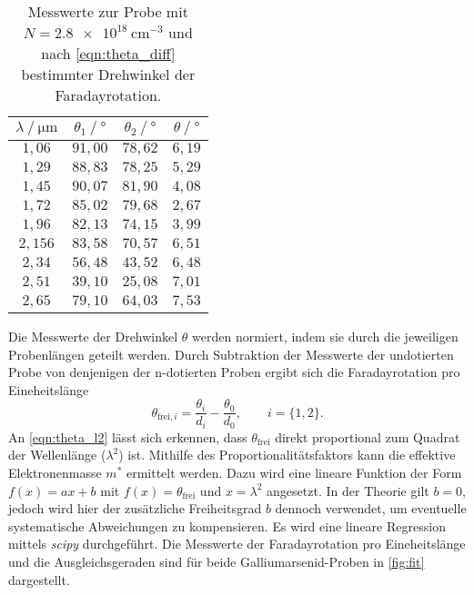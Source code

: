 \begin{table}
  \centering
  \caption{Messwerte zur Probe mit $N = \qty{2.8e18}{\centi\metre^{-3}}$ und nach \autoref{eqn:theta_diff} bestimmter Drehwinkel der Faradayrotation.}
  \label{tab:mw3}
  \begin{tabular}{c c c c}
    \toprule
    $\lambda \mathbin{/} \unit{\micro\meter}$ & $\theta_{1} \mathbin{/} \unit{\degree}$ & $\theta_{2} \mathbin{/} \unit{\degree}$ &%
     $\theta \mathbin{/} \unit{\degree}$ \\
    \midrule
    $1,06 $ & $91,00$ & $78,62$ & $6,19$ \\
    $1,29 $ & $88,83$ & $78,25$ & $5,29$ \\
    $1,45 $ & $90,07$ & $81,90$ & $4,08$ \\
    $1,72 $ & $85,02$ & $79,68$ & $2,67$ \\
    $1,96 $ & $82,13$ & $74,15$ & $3,99$ \\
    $2,156$ & $83,58$ & $70,57$ & $6,51$ \\
    $2,34 $ & $56,48$ & $43,52$ & $6,48$ \\
    $2,51 $ & $39,10$ & $25,08$ & $7,01$ \\
    $2,65 $ & $79,10$ & $64,03$ & $7,53$ \\
    \bottomrule
  \end{tabular}
\end{table}

Die Messwerte der Drehwinkel $\theta$ werden normiert, indem sie durch die jeweiligen Probenlängen geteilt werden. Durch Subtraktion der Messwerte der undotierten Probe von 
denjenigen der n-dotierten Proben ergibt sich die Faradayrotation pro Eineheitslänge 
\begin{equation*}
  \theta_{\text{frei}, i} = \frac{\theta_i}{d_i} - \frac{\theta_0}{d_0}, \qquad i = \{1, 2\}.
\end{equation*}
An \autoref{eqn:theta_l2} lässt sich erkennen, dass $\theta_\text{frei}$ direkt proportional zum Quadrat der Wellenlänge ($\lambda^2$) ist. Mithilfe des Proportionalitätsfaktors 
kann die effektive Elektronenmasse $m^*$ ermittelt werden. Dazu wird eine lineare Funktion der Form $f(x) = ax + b$ mit $f(x) = \theta_\text{frei}$ und $x = \lambda^2$
angesetzt. In der Theorie gilt $b = 0$, jedoch wird hier der zusätzliche Freiheitsgrad $b$ dennoch verwendet, um eventuelle systematische Abweichungen zu kompensieren.
Es wird eine lineare Regression mittels \textit{scipy} \cite{scipy} durchgeführt. Die Messwerte der Faradayrotation pro Eineheitslänge und die Ausgleichsgeraden sind für 
beide Galliumarsenid-Proben in \autoref{fig:fit} dargestellt.

